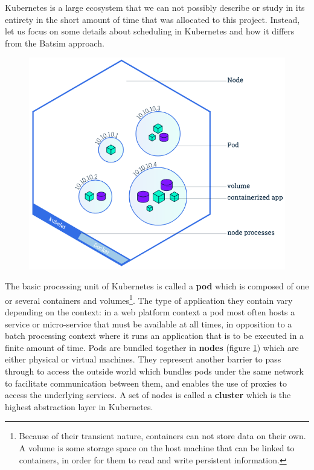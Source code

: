 Kubernetes is a large ecosystem that we can not possibly describe or study in
its entirety in the short amount of time that was allocated to this project.
Instead, let us focus on some details about scheduling in Kubernetes and how it
differs from the Batsim approach.

\begin{figure}[h]
	\centering
	\includegraphics[scale=0.5]{./imgs/node-overview.png}
	\label{fig:node-overview}
\end{figure}

The basic processing unit of Kubernetes is called a \textbf{pod} which is
composed of one or several containers and volumes\footnote{Because of their
	transient nature, containers can not store data on their own. A volume
	is some storage space on the host machine that can be linked to
containers, in order for them to read and write persistent information.}. The
type of application they contain vary depending on the context: in a web
platform context a pod most often hosts a service or micro-service that must be
available at all times, in opposition to a batch processing context where it
runs an application that is to be executed in a finite amount of time.  Pods
are bundled together in \textbf{nodes} (figure \ref{fig:node-overview}) which
are either physical or virtual machines. They represent another barrier to pass
through to access the outside world which bundles pods under the same network
to facilitate communication between them, and enables the use of proxies to
access the underlying services. A set of nodes is called a \textbf{cluster}
which is the highest abstraction layer in Kubernetes.

